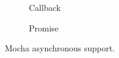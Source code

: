 
\begin{figure}[H]
	\newcommand{\basicstyle}{\scriptsize}
    \captionsetup[subfigure]{aboveskip=0em,belowskip=-0.2em}
	\begin{subfigure}[b]{0.45\textwidth}
        
        \caption{Callback}
        \label{fig:mocha_callback}
    \end{subfigure}
    \begin{subfigure}[b]{0.55\textwidth}
		
        \caption{Promise}
        \label{fig:mocha_promise}
    \end{subfigure}
	\caption{Mocha asynchronous support.}
	\label{fig:mocha_asynchronous_support}
\end{figure}
